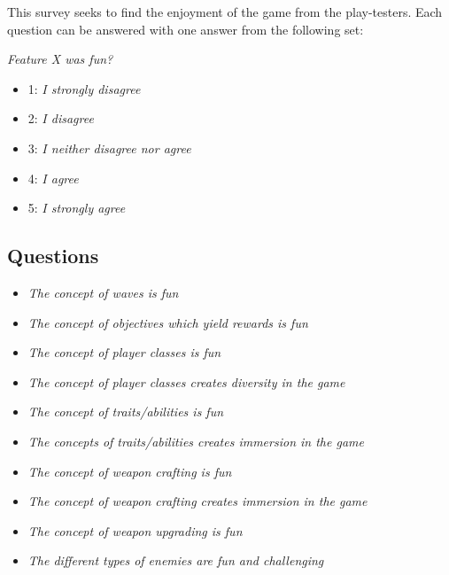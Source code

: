 This survey seeks to find the enjoyment of the game from the play-testers. Each question can be answered with one answer from the following set:

\emph{Feature X was fun?}
\begin{itemize}
\item 1: \emph{I strongly disagree}
\item 2: \emph{I disagree}
\item 3: \emph{I neither disagree nor agree}
\item 4: \emph{I agree}
\item 5: \emph{I strongly agree}
\end{itemize}

\subsection*{Questions}
\begin{itemize}
\item \emph{The concept of waves is fun}
\item \emph{The concept of objectives which yield rewards is fun}
\item \emph{The concept of player classes is fun}
\item \emph{The concept of player classes creates diversity in the game}
\item \emph{The concept of traits/abilities is fun}
\item \emph{The concepts of traits/abilities creates immersion in the game}
\item \emph{The concept of weapon crafting is fun}
\item \emph{The concept of weapon crafting creates immersion in the game}
\item \emph{The concept of weapon upgrading is fun}
\item \emph{The different types of enemies are fun and challenging}
\end{itemize}